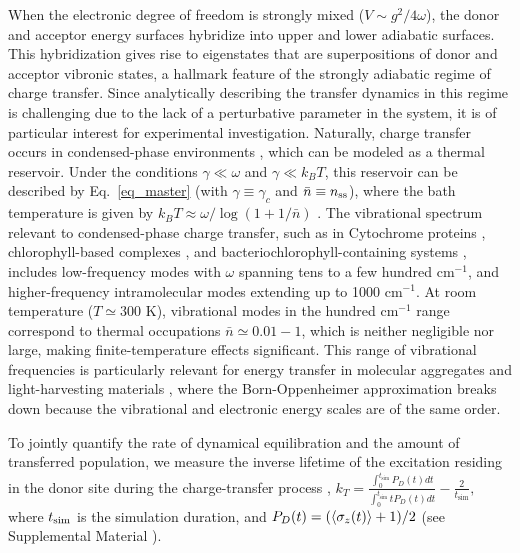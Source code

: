 \documentclass[%
reprint,
superscriptaddress,
amsmath,amssymb,
aps,
prl,
floatfix,
]{revtex4-2}
\begin{document}
When the electronic degree of freedom is strongly mixed ($V \sim g^2/4\omega$), the donor and acceptor energy surfaces hybridize into upper and lower adiabatic surfaces. This hybridization gives rise to eigenstates that are superpositions of donor and acceptor vibronic states, a hallmark feature of the strongly adiabatic regime of charge transfer. Since analytically describing the transfer dynamics in this regime is challenging due to the lack of a perturbative parameter in the system, it is of particular interest for experimental investigation. Naturally, charge transfer occurs in condensed-phase environments \cite{kang2024chemical}, which can be modeled as a thermal reservoir. Under the conditions $\gamma \ll \omega$ and $\gamma \ll k_B T$, this reservoir can be described by Eq.~\eqref{eq_master} (with $\gamma\equiv\gamma_c$ and $\bar{n}\equiv n_{\rm ss}$), where the bath temperature is given by $k_B T \approx \omega/\log(1+1/\bar{n})$ \cite{lemmer2018engineering,schlawin2021electrontransfer,so2024electrontransfer}. The vibrational spectrum relevant to condensed-phase charge transfer, such as in Cytochrome proteins \cite{sun2014lowfreq}, chlorophyll-based complexes \cite{ratsep2009chromo}, and bacteriochlorophyll-containing systems \cite{zhang2023pnas}, includes low-frequency modes with $\omega$ spanning tens to a few hundred cm$^{-1}$, and higher-frequency intramolecular modes extending up to 1000 cm$^{-1}$. At room temperature ($T\simeq 300$ K), vibrational modes in the hundred cm$^{-1}$ range correspond to thermal occupations $\bar{n}\simeq0.01-1$, which is neither negligible nor large, making finite-temperature effects significant. This range of vibrational frequencies is particularly relevant for energy transfer in molecular aggregates and light-harvesting materials \cite{fassioli2014vibration}, where the Born-Oppenheimer approximation breaks down because the vibrational and electronic energy scales are of the same order.

To jointly quantify the rate of dynamical equilibration and the amount of transferred population, we measure the inverse lifetime of the excitation residing in the donor site during the charge-transfer process \cite{skourtis1992photosynthesis,schlawin2021electrontransfer,so2024electrontransfer,so2025multimode}, $k_T=\frac{\int_{0}^{t_\text{sim}} P_D(t)dt}{\int_{0}^{t_\text{sim}} t P_D(t)dt} - \frac{2}{t_\text{sim}},$
where $t_{\rm sim}$ is the simulation duration, and $P_D(t)=(\braket{\sigma_z(t)}+1)/2$ \cite{so2024electrontransfer,so2025multimode,padilla2025delocalizedexcitationtransferopen} (see Supplemental Material \cite{so2025fT_supp}).
\end{document}
